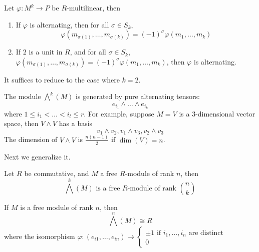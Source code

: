 \documentclass[openany]{book}
\begin{document}
\begin{prop}
    Let $\varphi:M^k\to P$ be $R$-multilinear, then 
    \begin{enumerate}
        \item If $\varphi$ is alternating, then for all $\sigma\in S_k$, 
        \begin{equation*}
            \varphi(m_{\sigma(1)},\dots, m_{\sigma(k)})=(-1)^\sigma\varphi(m_1,\dots,m_k)
        \end{equation*}
        \item If $2$ is a unit in $R$, and for all $\sigma\in S_k$, $ \varphi(m_{\sigma(1)},\dots, m_{\sigma(k)})=(-1)^\sigma\varphi(m_1,\dots,m_k)$, then $\varphi$ is alternating.
    \end{enumerate}
\end{prop}
It suffices to reduce to the case where $k=2$.


\begin{defn}
    The module $\bigwedge^k(M)$ is generated by pure alternating tensors:
    \begin{equation*}
        e_{i_1}\wedge\dots\wedge e_{i_k}
    \end{equation*}
    where $1\leq i_1<\dots<i_l\leq r$. For example, suppose $M=V$ is a $3$-dimensional vector space, then $V\wedge V$ has a basis 
    \begin{equation*}
        v_1\wedge v_2, v_1\wedge v_3, v_2\wedge v_3
    \end{equation*}
    The dimension of $V\wedge V$ is $\frac{n(n-1)}{2}$ if $\dim(V)=n$.
\end{defn}

Next we generalize it.
\begin{prop}
    Let $R$ be commutative, and $M$ a free $R$-module of rank $n$, then 
    \begin{equation*}
        \bigwedge^k(M) \text{ is a free $R$-module of rank }\binom{n}{k}
    \end{equation*}
\end{prop}

\begin{example}
    If $M$ is a free module of rank $n$, then 
    \begin{equation*}
        \bigwedge^n(M)\cong R
    \end{equation*}
    where the isomorphism $\varphi: (e_{i1},\dots, e_{in})\mapsto\begin{cases}
        \pm 1 \text{ if $i_1,\dots, i_n$ are distinct}\\
        0
    \end{cases}$
\end{example}
\end{document}
